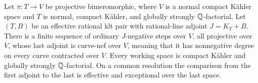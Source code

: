 \begin{proposition}
\label{prog:relative-klt}
Let \(\pi:T\to V\) be projective bimeromorphic, where \(V\) is a
normal compact Kähler space and \(T\) is normal, compact Kähler, and
globally strongly \(\mathbb Q\)-factorial.  Let \((T,B)\) be an effective
rational klt pair with rational-line adjoint \(J=K_T+B\).
There is a finite sequence of ordinary \(J\)-negative steps over
\(V\), all projective over \(V\), whose last adjoint is curve-nef
over \(V\), meaning that it has nonnegative degree on every curve
contracted over \(V\). Every working space is compact Kähler and globally
strongly \(\mathbb Q\)-factorial.  On a common resolution the comparison
from the first adjoint to the last is effective and exceptional over
the last space.
\end{proposition}

